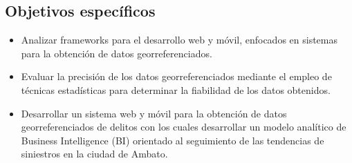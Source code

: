 \subsection{Objetivos específicos}

\begin{itemize}
      \item Analizar frameworks para el desarrollo web y móvil, enfocados en sistemas para la obtención
            de datos georreferenciados.
      \item Evaluar la precisión de los datos georreferenciados mediante el empleo de técnicas
            estadísticas para determinar la fiabilidad de los datos obtenidos.
      \item Desarrollar  un sistema web y móvil para la obtención de datos
            georreferenciados de delitos con los cuales desarrollar un modelo analítico de
            Business Intelligence (BI) orientado al seguimiento de las tendencias de siniestros
            en la ciudad de Ambato.
\end{itemize}